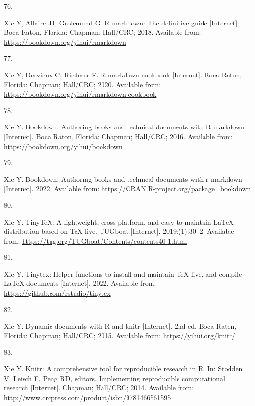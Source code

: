 \documentclass[10pt,a4paper]{article}
\newlength{\cslhangindent}
\newlength{\csllabelwidth}
\newlength{\cslentryspacingunit} %
\newenvironment{CSLReferences}[2] %
 {%
  \setlength{\parindent}{0pt}
  \ifodd #1
  \let\oldpar\par
  \def\par{\hangindent=\cslhangindent\oldpar}
  \fi
  \setlength{\parskip}{#2\cslentryspacingunit}
 }%
 {}
\newcommand{\CSLLeftMargin}[1]{\parbox[t]{\csllabelwidth}{#1}}
\newcommand{\CSLRightInline}[1]{\parbox[t]{\linewidth - \csllabelwidth}{#1}\break}
\begin{document}
\begin{CSLReferences}{0}{0}
\leavevmode{}%
\CSLLeftMargin{76. }
\CSLRightInline{Xie Y, Allaire JJ, Grolemund G. R markdown: The definitive guide {[}Internet{]}. Boca Raton, Florida: Chapman; Hall/CRC; 2018. Available from: \url{https://bookdown.org/yihui/rmarkdown}}

\leavevmode{}%
\CSLLeftMargin{77. }
\CSLRightInline{Xie Y, Dervieux C, Riederer E. R markdown cookbook {[}Internet{]}. Boca Raton, Florida: Chapman; Hall/CRC; 2020. Available from: \url{https://bookdown.org/yihui/rmarkdown-cookbook}}

\leavevmode{}%
\CSLLeftMargin{78. }
\CSLRightInline{Xie Y. Bookdown: Authoring books and technical documents with {R} markdown {[}Internet{]}. Boca Raton, Florida: Chapman; Hall/CRC; 2016. Available from: \url{https://bookdown.org/yihui/bookdown}}

\leavevmode{}%
\CSLLeftMargin{79. }
\CSLRightInline{Xie Y. Bookdown: Authoring books and technical documents with r markdown {[}Internet{]}. 2022. Available from: \url{https://CRAN.R-project.org/package=bookdown}}

\leavevmode{}%
\CSLLeftMargin{80. }
\CSLRightInline{Xie Y. TinyTeX: A lightweight, cross-platform, and easy-to-maintain LaTeX distribution based on TeX live. TUGboat {[}Internet{]}. 2019;(1):30--2. Available from: \url{https://tug.org/TUGboat/Contents/contents40-1.html}}

\leavevmode{}%
\CSLLeftMargin{81. }
\CSLRightInline{Xie Y. Tinytex: Helper functions to install and maintain TeX live, and compile LaTeX documents {[}Internet{]}. 2022. Available from: \url{https://github.com/rstudio/tinytex}}

\leavevmode{}%
\CSLLeftMargin{82. }
\CSLRightInline{Xie Y. Dynamic documents with {R} and knitr {[}Internet{]}. 2nd ed. Boca Raton, Florida: Chapman; Hall/CRC; 2015. Available from: \url{https://yihui.org/knitr/}}

\leavevmode{}%
\CSLLeftMargin{83. }
\CSLRightInline{Xie Y. Knitr: A comprehensive tool for reproducible research in {R}. In: Stodden V, Leisch F, Peng RD, editors. Implementing reproducible computational research {[}Internet{]}. Chapman; Hall/CRC; 2014. Available from: \url{http://www.crcpress.com/product/isbn/9781466561595}}


\end{CSLReferences}
\end{document}
